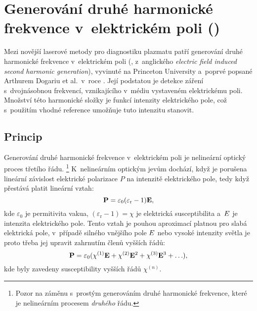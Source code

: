 \chapter[\EFISH]{Generování druhé harmonické frekvence
	v~elektrickém poli (\EFISH)}
\label{sec:efishth}

\newcommand\epol{P}
\newcommand\epolsh{P^{\mathnormal{(2\angfreq)}}}
\newcommand\esus{\chi}
\newcommand\esusn[1]{\esus^{(#1)}}
\newcommand\eper{\varepsilon}
\newcommand\epervac{\eper_0}
\newcommand\eperrel{\eper_\text{r}}
\newcommand\elfieldext{E_\text{ext}}
\newcommand\elfieldlaser{E^{(\mathnormal\angfreq)}}
\newcommand\efishconst{A}
\newcommand\itylaser{I_\text{laser}}

Mezi novější laserové metody pro diagnostiku plazmatu patří
generování druhé harmonické frekvence v~elektrickém poli (\EFISH{},
z~anglického \emph{electric field induced second harmonic generation}),
vyvinuté na Princeton University a~poprvé popsané
Arthurem Dogariu et al.~v~roce \citeyear{efish-original}.
\autocite{efish-original}
Její podstatou je detekce záření s~dvojnásobnou frekvencí, vznikajícího
v~médiu vystaveném elektrickému poli.
Množství této harmonické složky je funkcí intenzity elektrického pole,
což s~použitím vhodné reference umožňuje tuto intenzitu stanovit.

\section{Princip}
\label{sec:efishth-principle}
Generování druhé harmonické frekvence v~elektrickém poli
je nelineární optický proces třetího řádu.%
\footnote{Pozor na záměnu s~prostým generováním druhé harmonické frekvence,
které je nelineárním procesem \emph{druhého} řádu.}
K~nelineárním optickým jevům dochází, když je porušena lineární závislost
elektrické polarizace $\epol$ na intenzitě elektrického pole,
tedy když přestává platit lineární vztah:
\begin{equation}
	\label{eq:efishth-epol-linear}
	\vec\epol = \epervac (\eperrel - 1) \vec\elfield,
\end{equation}
kde $\epervac$ je permitivita vakua,
$(\eperrel - 1) = \esus$ je elektrická susceptibilita
a~$E$ je intenzita elektrického pole.
Tento vztah je pouhou aproximací platnou pro slabá elektrická pole,
v~případě silného vnějšího pole $E$ nebo vysoké intenzity světla
je proto třeba jej upravit zahrnutím členů vyšších řádů:
\begin{equation}
	\label{eq:efishth-epol-general}
	\vec\epol = \epervac (\esusn1\vec\elfield + \esusn2\vec\elfield^2
		+ \esusn3\vec\elfield^3 + \ldots),
\end{equation}
kde byly zavedeny susceptibility vyšších řádů $\esusn{n}$.

